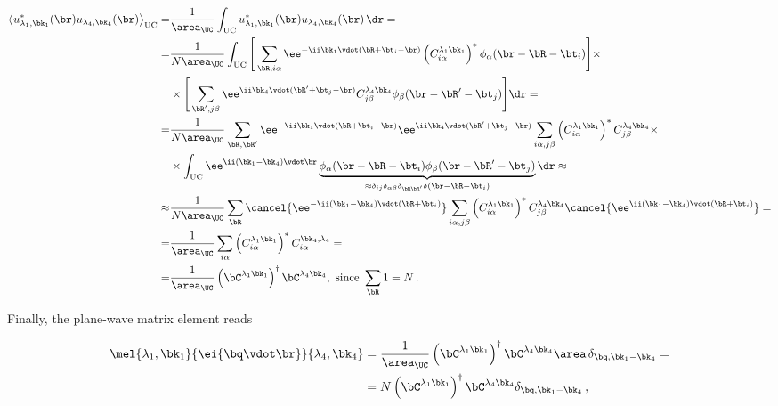 \begin{align}
    \label{eq:envelope_function_approximation}
    \left\langle u_{\lambda_1, \bk_1}^{*}(\br)u_{\lambda_4, \bk_4}(\br)\right\rangle _{\mathrm{UC}} =& \frac{1}{\area_{\UC}} \int_{\mathrm{UC}} u_{\lambda_1, \bk_1}^{*}(\br) u_{\lambda_4, \bk_4}(\br)\, \dr = \notag\\
    =& \frac{1}{N \area_{\UC}} \int_{\mathrm{UC}} \Bigg[\sum_{\bR,i\alpha}\ee^{-\ii\bk_{1}\vdot(\bR + \bt_{i} - \br)} \left(C_{i \alpha}^{\lambda_1 \bk_1}\right)^{*}\phi_{\alpha}(\br-\bR-\bt_{i})\Bigg] \times \notag \\
    & \times \Bigg[\sum_{\bR',j\beta} \ee^{\ii\bk_{4}\vdot(\bR'+\bt_{j}-\br)} C_{j \beta}^{\lambda_4 \bk_4}\phi_{\beta}(\br-\bR'-\bt_{j})\Bigg]\dr = \notag \\
    =&\frac{1}{N \area_{\UC}} \sum_{\bR,\bR'}\ee^{-\ii\bk_{1}\vdot(\bR + \bt_{i} - \br)} \ee^{\ii\bk_{4}\vdot(\bR'+\bt_{j}-\br)} \sum_{i\alpha,j\beta}\left(C_{i \alpha}^{\lambda_1 \bk_1}\right)^{*}C_{j \beta}^{\lambda_4 \bk_4} \times \notag \\
    & \times \int_{\mathrm{UC}} \ee^{\ii(\bk_{1}-\bk_{4})\vdot\br}\underbrace{\phi_{\alpha}(\br-\bR-\bt_{i})\phi_{\beta} (\br-\bR'-\bt_{j})}_{\approx \delta_{ij} \delta_{\alpha \beta} \delta_{\bR \bR'} \delta(\br-\bR-\bt_{i})}\dr \approx \notag\\
    \approx & \frac{1}{N \area_{\UC}} \sum_{\bR} \cancel{\ee^{-\ii(\bk_{1}-\bk_{4})\vdot(\bR+\bt_{i})}} \sum_{i\alpha,j\beta} \left(C_{i \alpha}^{\lambda_1 \bk_1}\right)^{*} C_{j \beta}^{\lambda_4 \bk_4} \cancel{\ee^{\ii(\bk_{1}-\bk_{4})\vdot(\bR+\bt_{i})}} = \notag \\
    =&\frac{1}{\area_{\UC}} \sum_{i\alpha}\left(C_{i \alpha}^{\lambda_1 \bk_1}\right)^{*} C_{i\alpha}^{\bk_{4},\lambda_{4}} = \\
    =&\frac{1}{\area_{\UC}}\left(\bC^{\lambda_1 \bk_1}\right)^{\dagger}\bC^{\lambda_4 \bk_4},\text{ since }\sum_{\bR}1=N\,.
\end{align}

\noindent Finally, the plane-wave matrix element reads

\begin{equation}
    \begin{aligned}
        \mel{\lambda_1, \bk_1}{\ei{\bq \vdot \br}}{\lambda_4, \bk_4} & = \frac{1}{\area_{\UC}}\left(\bC^{\lambda_1 \bk_1}\right)^{\dagger} \bC^{\lambda_4 \bk_4} \area \,\delta_{\bq,\bk_{1}-\bk_{4}} = \\
                                                                   & = N \left(\bC^{\lambda_1 \bk_1}\right)^{\dagger}\bC^{\lambda_4 \bk_4}\delta_{\bq,\bk_{1}-\bk_{4}}\,,
    \end{aligned}
\end{equation}

